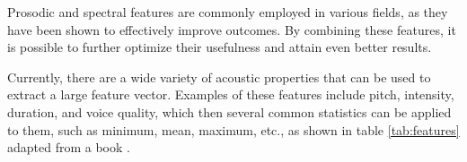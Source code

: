 Prosodic and spectral features are commonly employed in various fields, as they have been shown to effectively improve outcomes. By combining these features, it is possible to further optimize their usefulness and attain even better results.

Currently, there are a wide variety of acoustic properties that can be used to extract a large feature vector. Examples of these features include pitch, intensity, duration, and voice quality, which then several common statistics can be applied to them, such as minimum, mean, maximum, etc., as shown in table \ref{tab:features} adapted from a book \cite{Schuller2011}.


\begin{table}[h]
\centering
\caption{Overview on features commonly used for acoustic emotion recognition \cite{Schuller2011}.}
\label{tab:features}
\end{table}
